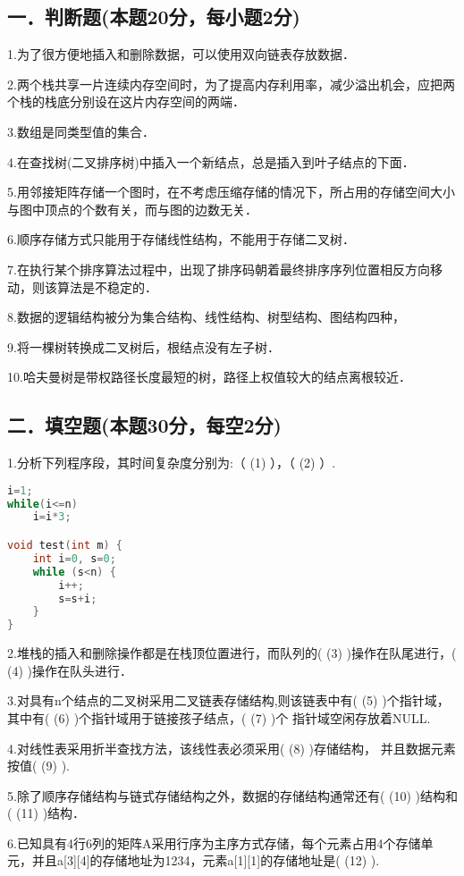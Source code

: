 
\subsection{一．判断题(本题20分，每小题2分)}
1.为了很方便地插入和删除数据，可以使用双向链表存放数据．

2.两个栈共享一片连续内存空间时，为了提高内存利用率，减少溢出机会，应把两个栈的栈底分别设在这片内存空间的两端．

3.数组是同类型值的集合．

4.在查找树(二叉排序树)中插入一个新结点，总是插入到叶子结点的下面．

5.用邻接矩阵存储一个图时，在不考虑压缩存储的情况下，所占用的存储空间大小与图中顶点的个数有关，而与图的边数无关．

6.顺序存储方式只能用于存储线性结构，不能用于存储二叉树．

7.在执行某个排序算法过程中，出现了排序码朝着最终排序序列位置相反方向移动，则该算法是不稳定的．

8.数据的逻辑结构被分为集合结构、线性结构、树型结构、图结构四种，

9.将一棵树转换成二叉树后，根结点没有左子树．

10.哈夫曼树是带权路径长度最短的树，路径上权值较大的结点离根较近．


\subsection{二．填空题(本题30分，每空2分)}
1.分析下列程序段，其时间复杂度分别为:（ (1) ），（ (2) ）.
\begin{lstlisting}[language=cpp]
i=1;
while(i<=n)
    i=i*3;

void test(int m) {
    int i=0, s=0;
    while (s<n) {
        i++;
        s=s+i;
    }
}
\end{lstlisting}

2.堆栈的插入和删除操作都是在栈顶位置进行，而队列的( (3) )操作在队尾进行，( (4) )操作在队头进行．

3.对具有n个结点的二叉树采用二叉链表存储结构,则该链表中有( (5) )个指针域，其中有( (6) )个指针域用于链接孩子结点，( (7) )个 指针域空闲存放着NULL.

4.对线性表采用折半查找方法，该线性表必须采用( (8) )存储结构， 并且数据元素按值( (9) ).

5.除了顺序存储结构与链式存储结构之外，数据的存储结构通常还有( (10) )结构和( (11) )结构．

6.已知具有4行6列的矩阵A采用行序为主序方式存储，每个元素占用4个存储单元，并且a[3][4]的存储地址为1234，元素a[1][1]的存储地址是( (12) ).

